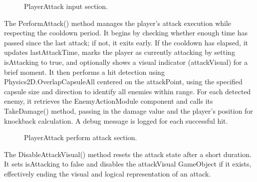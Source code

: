 \documentclass[12pt,oneside,openright,a4paper]{cpe-english-project}
\begin{document}
 \begin{figure}[!h]
 \centering
\caption{PlayerAttack input section.}\label{fig:input}
\end{figure}
\newpage
The PerformAttack() method manages the player's attack execution while respecting the cooldown period. It begins by checking whether enough time has passed since the last attack; if not, it exits early. If the cooldown has elapsed, it updates lastAttackTime, marks the player as currently attacking by setting isAttacking to true, and optionally shows a visual indicator (attackVisual) for a brief moment. It then performs a hit detection using Physics2D.OverlapCapsuleAll centered on the attackPoint, using the specified capsule size and direction to identify all enemies within range. For each detected enemy, it retrieves the EnemyActionModule component and calls its TakeDamage() method, passing in the damage value and the player’s position for knockback calculation. A debug message is logged for each successful hit.\par
 \begin{figure}[!h]
 \centering
\caption{PlayerAttack perform attack section.}\label{fig:attack}
\end{figure}
The DisableAttackVisual() method resets the attack state after a short duration. It sets isAttacking to false and disables the attackVisual GameObject if it exists, effectively ending the visual and logical representation of an attack.
\end{document}
